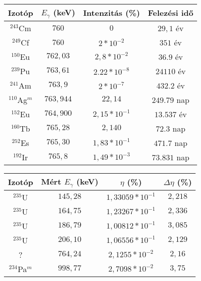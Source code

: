 \begin{center}
\begin{tabular}{|c|c|c|c|}
\hline
Izotóp 			 & $E_{\gamma}$ (keV) & Intenzitás (\%) & Felezési idő \\
\hline
$^{243}$Cm       & $760$     & $0$              & $29,1$ év    \\
$^{249}$Cf       & $760$     & $2 * 10^{-2}$    & $351$ év     \\
$^{150}$Eu       & $762,03$  & $2,8 * 10^{-2}$  & $36.9$ év    \\
$^{239}$Pu       & $763,61$  & $2.22 * 10^{-8}$ & $24110$ év   \\
$^{241}$Am       & $763,9$   & $2 * 10^{-7}$    & $432.2$ év   \\
$^{110}$Ag$^{m}$ & $763,944$ & $22,14$          & $249.79$ nap \\
$^{152}$Eu       & $764,900$ & $2,15 * 10^{-1}$ & $	13.537$ év \\
$^{160}$Tb       & $765,28$  & $2,140$          & $72.3$ nap   \\
$^{252}$Es       & $765,30$  & $1,83 * 10^{-1}$ & $471.7$ nap  \\
$^{192}$Ir       & $765,8$   & $1,49 * 10^{-3}$ & $73.831$ nap \\
\hline
\end{tabular}
 \label{table:2}
\end{center}

\begin{center}
\begin{tabular}{|c|c|c|c|}
\hline
Izotóp 			 & Mért $E_{\gamma}$ (keV) & $\eta$ (\%)          & $\Delta \eta$ (\%) \\
\hline
$^{235}$U 		 & $145,28$                & $1,33059 * 10^{-1}$  & $2,218$ \\
$^{235}$U 		 & $164,75$ 	           & $1,23267 * 10^{-1}$  & $2,336$ \\
$^{235}$U 		 & $186,79$ 	           & $1,00812 * 10^{-1}$  & $3,085$ \\
$^{235}$U        & $206,10$ 	           & $1,06556 * 10^{-1}$  & $2,129$ \\
?                & $764,24$ 	           & $2,1255 * 10^{-2}$   & $2,16$  \\
$^{234}$Pa$^{m}$ & $998,77$ 	           & $2,7098 * 10^{-2}$   & $3,75$  \\
\hline
\end{tabular}
 \label{table:3}
\end{center}